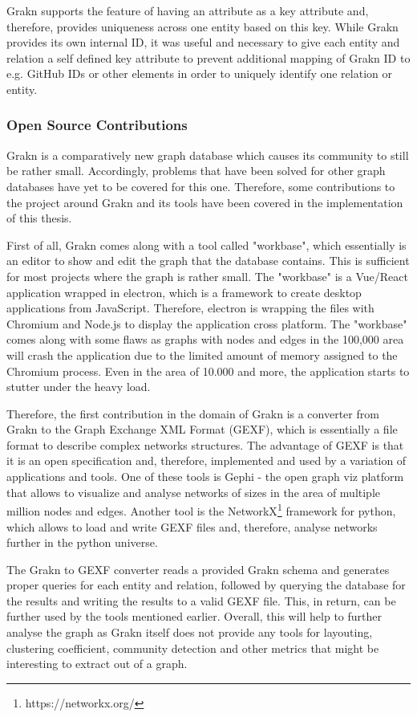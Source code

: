 Grakn supports the feature of having an attribute as a key attribute and, therefore, provides uniqueness across one entity based on this key. While Grakn provides its own internal ID, it was useful and necessary to give each entity and relation a self defined key attribute to prevent additional mapping of Grakn ID to e.g. GitHub IDs or other elements in order to uniquely identify one relation or entity.

\subsubsection{Open Source Contributions}
\label{sec:opensource}
Grakn is a comparatively new graph database which causes its community to still be rather small. Accordingly, problems that have been solved for other graph databases have yet to be covered for this one. Therefore, some contributions to the project around Grakn and its tools have been covered in the implementation of this thesis.

First of all, Grakn comes along with a tool called "workbase", which essentially is an editor to show and edit the graph that the database contains. This is sufficient for most projects where the graph is rather small. The "workbase" is a Vue/React application wrapped in electron, which is a framework to create desktop applications from JavaScript. Therefore, electron is wrapping the files with Chromium and Node.js to display the application cross platform. The "workbase" comes along with some flaws as graphs with nodes and edges in the 100,000 area will crash the application due to the limited amount of memory assigned to the Chromium process. Even in the area of 10.000 and more, the application starts to stutter under the heavy load.

Therefore, the first contribution in the domain of Grakn is a converter from Grakn to the Graph Exchange XML Format (GEXF), which is essentially a file format to describe complex networks structures.
The advantage of GEXF is that it is an open specification and, therefore, implemented and used by a variation of applications and tools. One of these tools is Gephi - the open graph viz platform that allows to visualize and analyse networks of sizes in the area of multiple million nodes and edges. Another tool is the NetworkX\footnote{https://networkx.org/} framework for python, which allows to load and write GEXF files and, therefore, analyse networks further in the python universe.

The Grakn to GEXF converter reads a provided Grakn schema and generates proper queries for each entity and relation, followed by querying the database for the results and writing the results to a valid GEXF file. This, in return, can be further used by the tools mentioned earlier. Overall, this will help to further analyse the graph as Grakn itself does not provide any tools for layouting, clustering coefficient, community detection and other metrics that might be interesting to extract out of a graph.

